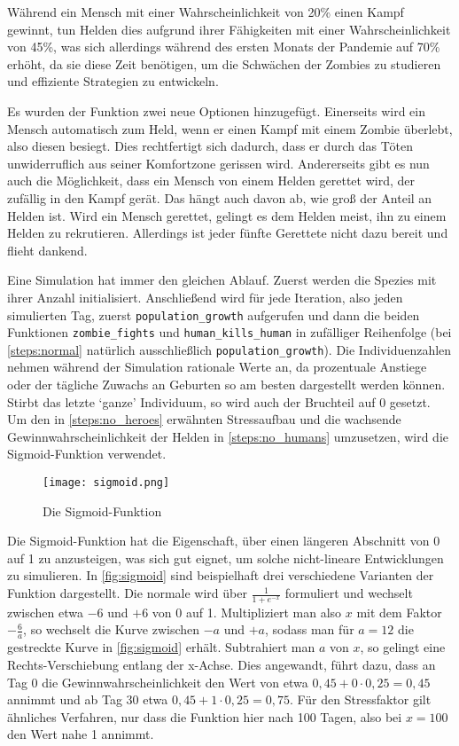 \begin{enumerate}[1.]
            Während ein Mensch mit einer Wahrscheinlichkeit von 20\% einen Kampf gewinnt, tun Helden dies aufgrund ihrer Fähigkeiten mit einer Wahrscheinlichkeit von 45\%, was sich allerdings während des ersten Monats der Pandemie auf 70\% erhöht, da sie diese Zeit benötigen, um die Schwächen der Zombies zu studieren und effiziente Strategien zu entwickeln.

            Es wurden der Funktion zwei neue Optionen hinzugefügt. Einerseits wird ein Mensch automatisch zum Held, wenn er einen Kampf mit einem Zombie überlebt, also diesen besiegt. Dies rechtfertigt sich dadurch, dass er durch das Töten unwiderruflich aus seiner Komfortzone gerissen wird. Andererseits gibt es nun auch die Möglichkeit, dass ein Mensch von einem Helden gerettet wird, der zufällig in den Kampf gerät. Das hängt auch davon ab, wie groß der Anteil an Helden ist. Wird ein Mensch gerettet, gelingt es dem Helden meist, ihn zu einem Helden zu rekrutieren. Allerdings ist jeder fünfte Gerettete nicht dazu bereit und flieht dankend.
            \label{steps:no_humans}
    \end{enumerate}
    Eine Simulation hat immer den gleichen Ablauf. Zuerst werden die Spezies mit ihrer Anzahl initialisiert. Anschließend wird für jede Iteration, also jeden simulierten Tag, zuerst \texttt{population\_growth} aufgerufen und dann die beiden Funktionen \texttt{zombie\_fights} und \texttt{human\_kills\_human} in zufälliger Reihenfolge (bei \autoref{steps:normal} natürlich ausschließlich \texttt{population\_growth}). Die Individuenzahlen nehmen während der Simulation rationale Werte an, da prozentuale Anstiege oder der tägliche Zuwachs an Geburten so am besten dargestellt werden können. Stirbt das letzte `ganze' Individuum, so wird auch der Bruchteil auf 0 gesetzt. 
    \newpage
    Um den in \autoref{steps:no_heroes} erwähnten Stressaufbau und die wachsende Gewinnwahrscheinlichkeit der Helden in \autoref{steps:no_humans} umzusetzen, wird die Sigmoid-Funktion verwendet.\par
    \begin{figure}[h]
        \centering
        \texttt{[image: sigmoid.png]}
        \caption{Die Sigmoid-Funktion}
        \label{fig:sigmoid}
    \end{figure}
    Die Sigmoid-Funktion hat die Eigenschaft, über einen längeren Abschnitt von 0 auf 1 zu anzusteigen, was sich gut eignet, um solche nicht-lineare Entwicklungen zu simulieren. In \autoref{fig:sigmoid} sind beispielhaft drei verschiedene Varianten der Funktion dargestellt. Die normale wird über \(\frac{1}{1 + e^{-x}}\) formuliert und wechselt zwischen etwa \(-6\) und \(+6\) von 0 auf 1. Multipliziert man also \(x\) mit dem Faktor \(-\frac{6}{a}\), so wechselt die Kurve zwischen \(-a\) und \(+a\), sodass man für \(a=12\) die gestreckte Kurve in \autoref{fig:sigmoid} erhält. Subtrahiert man \(a\) von \(x\), so gelingt eine Rechts-Verschiebung entlang der x-Achse. Dies angewandt, führt dazu, dass an Tag 0 die Gewinnwahrscheinlichkeit den Wert von etwa \(0,45 + 0 \cdot 0,25 = 0,45\) annimmt und ab Tag 30 etwa \(0,45 + 1 \cdot 0,25 = 0,75\). Für den Stressfaktor gilt ähnliches Verfahren, nur dass die Funktion hier nach 100 Tagen, also bei \(x=100\) den Wert nahe 1 annimmt.
